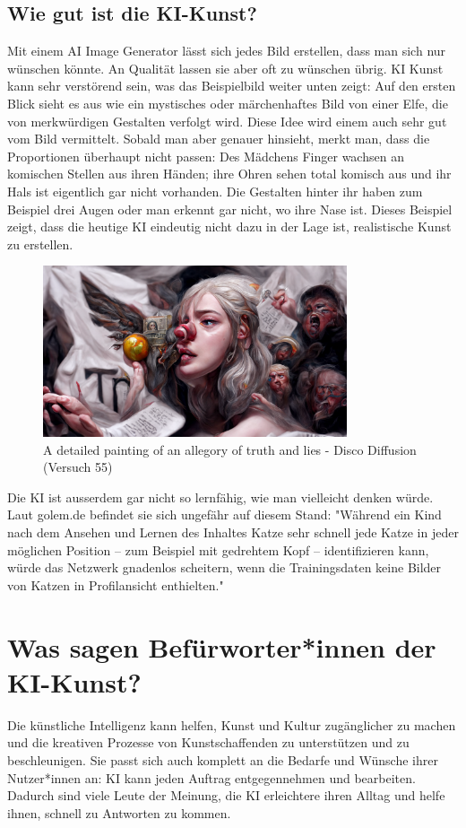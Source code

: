 \documentclass{article}
\begin{document}
    \subsection{Wie gut ist die KI-Kunst?}
        Mit einem AI Image Generator lässt sich jedes Bild erstellen, dass man sich nur wünschen könnte. 
        An Qualität lassen sie aber oft zu wünschen übrig. 
        KI Kunst kann sehr verstörend sein, was das Beispielbild weiter unten zeigt: Auf den ersten Blick sieht es aus wie ein mystisches oder märchenhaftes Bild von einer Elfe, die von merkwürdigen Gestalten verfolgt wird. Diese Idee wird einem auch sehr gut vom Bild vermittelt. Sobald man aber genauer hinsieht, merkt man, dass die Proportionen überhaupt nicht passen: Des Mädchens Finger wachsen an komischen Stellen aus ihren Händen; ihre Ohren sehen total komisch aus und ihr Hals ist eigentlich gar nicht vorhanden. Die Gestalten hinter ihr haben zum Beispiel drei Augen oder man erkennt gar nicht, wo ihre Nase ist. Dieses Beispiel zeigt, dass die heutige KI eindeutig nicht dazu in der Lage ist, realistische Kunst zu erstellen.
        \begin{figure}[ht]
        \centering
        \includegraphics[width=0.8\textwidth]{ki-bild.png} 
        \caption{A detailed painting of an allegory of truth and lies - Disco Diffusion (Versuch 55)}
        \label{fig:ki-bild}
        \end{figure}
    
        Die KI ist ausserdem gar nicht so lernfähig, wie man vielleicht denken würde. Laut golem.de befindet sie sich ungefähr auf diesem Stand: "Während ein Kind nach dem Ansehen und Lernen des Inhaltes Katze sehr schnell jede Katze in jeder möglichen Position – zum Beispiel mit gedrehtem Kopf – identifizieren kann, würde das Netzwerk gnadenlos scheitern, wenn die Trainingsdaten keine Bilder von Katzen in Profilansicht enthielten." 

\section{Was sagen Befürworter*innen der KI-Kunst?}
    Die künstliche Intelligenz kann helfen, Kunst und Kultur zugänglicher zu machen und die kreativen 
    Prozesse von Kunstschaffenden zu unterstützen und zu beschleunigen.  Sie passt sich auch komplett an die Bedarfe und Wünsche ihrer Nutzer*innen an: KI kann jeden Auftrag entgegennehmen und bearbeiten. Dadurch sind viele Leute der Meinung, die KI erleichtere ihren Alltag und helfe ihnen, schnell zu Antworten zu kommen.
    
\end{document}
